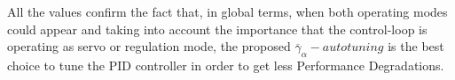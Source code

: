 All the values confirm the fact that, in global terms, when both
operating modes could appear and taking into account the
importance that the control-loop is operating as servo or
regulation mode, the proposed
$\overline{\gamma}_{\alpha}-autotuning$ is the best choice to tune
the PID controller in order to get less Performance Degradations.




